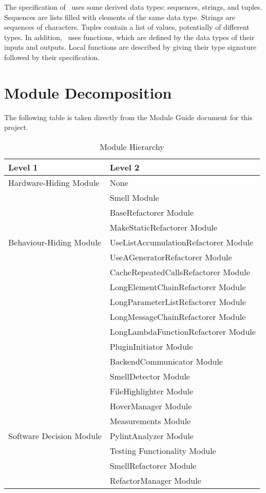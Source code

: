 \documentclass[12pt, titlepage]{article}
\begin{document}
\noindent
The specification of \progname \ uses some derived data types: sequences, strings, and
tuples. Sequences are lists filled with elements of the same data type. Strings
are sequences of characters. Tuples contain a list of values, potentially of
different types. In addition, \progname \ uses functions, which
are defined by the data types of their inputs and outputs. Local functions are
described by giving their type signature followed by their specification.

\section{Module Decomposition}

The following table is taken directly from the Module Guide document for this project.

\begin{table}[h!]
  \centering
  \begin{tabular}{p{} p{}}
    \toprule
    \textbf{Level 1} & \textbf{Level 2}\\
    \midrule
    
    {Hardware-Hiding Module} & None \\
    \midrule
    
    \multirow{7}{0.3\textwidth}{Behaviour-Hiding Module} & Smell Module\\
    & BaseRefactorer Module\\
    & MakeStaticRefactorer Module\\
    & UseListAccumulationRefactorer Module\\
    & UseAGeneratorRefactorer Module\\
    & CacheRepeatedCallsRefactorer Module\\
    & LongElementChainRefactorer Module\\
    & LongParameterListRefactorer Module\\
    & LongMessageChainRefactorer Module\\
    & LongLambdaFunctionRefactorer Module\\ 
    & PluginInitiator Module\\
    & BackendCommunicator Module\\ 
    & SmellDetector Module\\
    & FileHighlighter Module\\
    & HoverManager Module\\
    \midrule
    
    
    \multirow{3}{0.3\textwidth}{Software Decision Module} & Measurements Module\\
    & PylintAnalyzer Module\\
    & Testing Functionality Module\\
    & SmellRefactorer Module\\
    & RefactorManager Module\\
    \bottomrule
  \end{tabular}
  \caption{Module Hierarchy}
  \label{TblMH}
\end{table}
\end{document}
